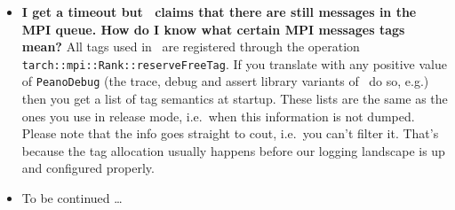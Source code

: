 \begin{itemize}
  arise due to AMR and typically are sorted out an iteration later anyway---and
  apply heuristics. If they detect that the global cell number seems to be too
  small, e.g., they assume that every rank meanwhile has refined once more and
  multiply the global cell count with $3^d$.
  \item \textbf{I get a timeout but \Peano\ claims that there are still
  messages in the MPI queue. How do I know what certain MPI messages tags
  mean?} All tags used in \Peano\ are registered through the operation \linebreak 
  \texttt{tarch::mpi::Rank::reserveFreeTag}. If you translate with any positive
  value of \texttt{PeanoDebug} (the trace, debug and assert library variants of
  \Peano\ do so, e.g.) then you get a list of tag semantics at startup. These
  lists are the same as the ones you use in release mode, i.e.~when this
  information is not dumped. Please note that the info goes straight to cout,
  i.e.~you can't filter it. That's because the tag allocation usually happens
  before our logging landscape is up and configured properly.
  \item To be continued \dots
\end{itemize}




\section{\ExaHyPE}

